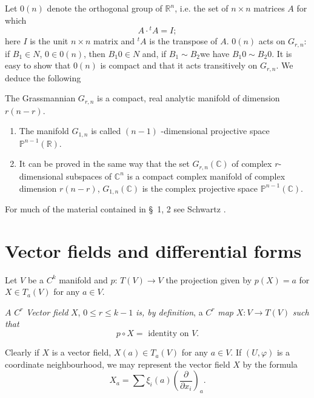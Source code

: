   Let $0(n)$ denote the orthogonal group of $\mathbb{R}^n$, i.e. the
  set of $n \times n$ matrices $A$ for which  
  $$
  A \cdot {}^t A =I;
  $$
  here $I$ is the unit $n \times n$ matrix and $^t A$ is the transpose
  of $A$. $0(n)$ acts on $G_{r,n}$: if $B_1 \in N$, $0 \in 0(n)$, then
  $B_1 0 \in N$ and, if  $B_1 \sim B_2$\pageoriginale we have $B_1 0 \sim B_2 0$. It
  is easy to show that $0(n)$ is compact and that it acts transitively
  on $G_{r,n}$. We deduce the following  

  \begin{prop*}
    The Grassmannian $G_{r,n}$ is a compact, real analytic manifold of
    dimension $r(n-r)$.  
  \end{prop*}    

\begin{remarks*} %
  \begin{enumerate}        
  \item The manifold $G_{1,n}$ is called $(n-1)$ -dimensional
    projective space $\mathbb{P}^{n-1}(\mathbb{R})$. 
  \item It can  be proved in the same way that the set $G_{r,n}(
    \mathbb{C})$ of complex $r$-dimensional subspaces of $\mathbb{C}^n$
    is a compact complex manifold of complex dimension $r(n-r)$,
    $G_{1,n}(\mathbb{C})$ is the complex projective space
    $\mathbb{P}^{n-1} ( \mathbb{C})$. 
  \end{enumerate}
\end{remarks*}
    
For much of the material contained in \S\ 1, 2 see Schwartz \cite{40}.
    
\section{Vector fields and differential forms}\label{chap2:sec2} %
    
Let $V$ be a $C^k$ manifold and $p$: $T(V) \to V$ the projection given
by $p(X)=a$ for $X \in  T_a (V)$ for any  $ a \in V$. 
\begin{defi*}
  $A$ $C^r$ {\em Vector field} $X$, $0 \le r \le k-1$ {\em is, by
    definition}, a $C^r$ {\em map} $X: V \to T(V)$ {\em such that } 
  $$
  p \circ X = \text{ identity on } V.
  $$
\end{defi*}  
        
Clearly if $X$ is a vector field, $X(a) \in T_a (V)$ for any  $a \in
V$.  If $(U,\varphi)$ is a coordinate neighbourhood, we may represent
the vector field $X$ by the formula 
$$
X_a = \sum \xi_i (a) \left(\frac{\partial}{\partial x_i}\right)_a.
$$
    
